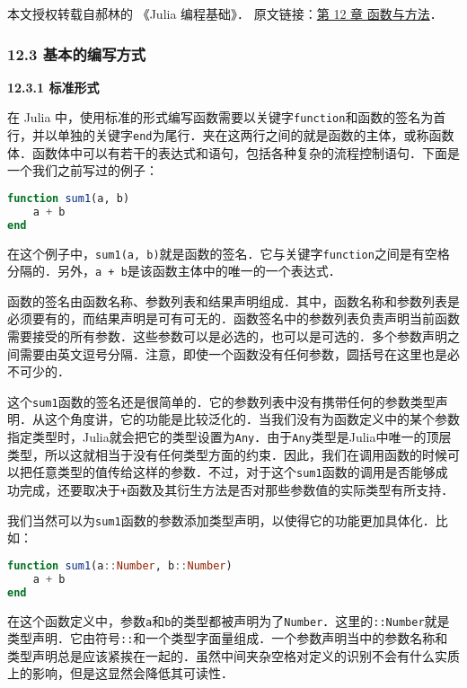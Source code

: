 
本文授权转载自郝林的 《Julia 编程基础》． 原文链接：\href{https://github.com/hyper0x/JuliaBasics/blob/master/book/ch12.md}{第 12 章 函数与方法}．

\subsubsection{12.3 基本的编写方式}

\textbf{12.3.1 标准形式}

在 Julia 中，使用标准的形式编写函数需要以关键字\verb|function|和函数的签名为首行，并以单独的关键字\verb|end|为尾行．夹在这两行之间的就是函数的主体，或称函数体．函数体中可以有若干的表达式和语句，包括各种复杂的流程控制语句．下面是一个我们之前写过的例子：

\begin{lstlisting}[language=julia]
function sum1(a, b)
    a + b
end
\end{lstlisting}

在这个例子中，\verb|sum1(a, b)|就是函数的签名．它与关键字\verb|function|之间是有空格分隔的．另外，\verb|a + b|是该函数主体中的唯一的一个表达式．

函数的签名由函数名称、参数列表和结果声明组成．其中，函数名称和参数列表是必须要有的，而结果声明是可有可无的．函数签名中的参数列表负责声明当前函数需要接受的所有参数．这些参数可以是必选的，也可以是可选的．多个参数声明之间需要由英文逗号分隔．注意，即使一个函数没有任何参数，圆括号在这里也是必不可少的．

这个\verb|sum1|函数的签名还是很简单的．它的参数列表中没有携带任何的参数类型声明．从这个角度讲，它的功能是比较泛化的．当我们没有为函数定义中的某个参数指定类型时，Julia就会把它的类型设置为\verb|Any|．由于\verb|Any|类型是Julia中唯一的顶层类型，所以这就相当于没有任何类型方面的约束．因此，我们在调用函数的时候可以把任意类型的值传给这样的参数．不过，对于这个\verb|sum1|函数的调用是否能够成功完成，还要取决于\verb|+|函数及其衍生方法是否对那些参数值的实际类型有所支持．

我们当然可以为\verb|sum1|函数的参数添加类型声明，以使得它的功能更加具体化．比如：

\begin{lstlisting}[language=julia]
function sum1(a::Number, b::Number)
    a + b
end
\end{lstlisting}

在这个函数定义中，参数\verb|a|和\verb|b|的类型都被声明为了\verb|Number|．这里的\verb|::Number|就是类型声明．它由符号\verb|::|和一个类型字面量组成．一个参数声明当中的参数名称和类型声明总是应该紧挨在一起的．虽然中间夹杂空格对定义的识别不会有什么实质上的影响，但是这显然会降低其可读性．

